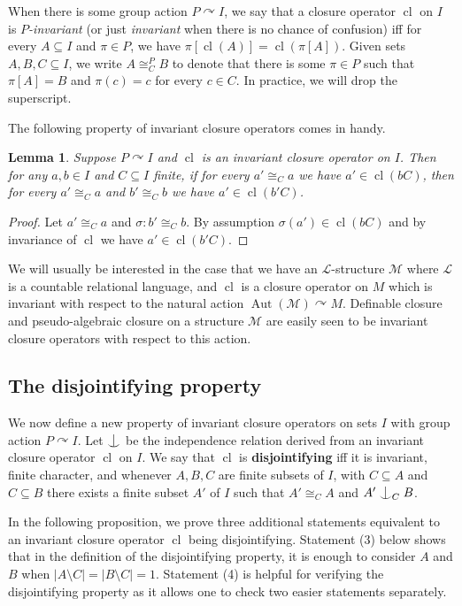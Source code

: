 \documentclass[12pt]{amsart}
\theoremstyle{plain}
\newtheorem{lemma}[theorem]{Lemma}
\theoremstyle{definition}
\newcommand{\isom}{\cong}
\newcommand{\mcL}{\mathcal{L}}
\newcommand{\mcM}{\mathcal{M}}
\DeclareMathOperator{\Aut}{Aut}
\DeclareMathOperator{\cl}{cl}
\newcommand{\forkindep}[1][]{%
  \mathrel{
    \mathop{
      \vcenter{
        \hbox{\oalign{\noalign{\kern-.3ex}\hfil$\vert$\hfil\cr
              \noalign{\kern-.7ex}
              $\smile$\cr\noalign{\kern-.3ex}}}
      }
    }\displaylimits_{#1}
  }
}
\begin{document}
When there is some group action $P \curvearrowright I$, we say that a closure operator $\cl$ on $I$ is 
\emph{$P$-invariant} (or just \emph{invariant} when there is no chance of confusion) iff for every $A \subseteq I$ and $\pi \in P$, we have $\pi[\cl(A)] = \cl(\pi[A])$. 
Given sets $A, B, C \subseteq I$, we write $A \isom^P_C B$ to denote that there is some $\pi \in P$ such that $\pi[A] = B$ and $\pi(c) = c$ for every $c \in C$.
In practice, we will drop the superscript.

The following property of invariant closure operators comes in handy.
\begin{lemma}\label{lem:one_side}
Suppose $P \curvearrowright I$ and $\cl$ is an invariant closure operator on $I$. Then for any $a, b \in I$ and $C \subseteq I$ finite, if for every $a' \isom_{C} a$ we have $a' \in \cl(bC)$, then for every $a' \isom_{C} a$ and $b' \isom_{C} b$ we have $a' \in \cl(b' C)$.
\end{lemma}

\begin{proof}
Let $a' \isom_C a$ and $\sigma : b' \isom_C b$. By assumption $\sigma(a') \in \cl(bC)$ and by invariance of $\cl$ we have $a' \in \cl(b'C)$.
\end{proof}

We will usually be interested in the case that we have an $\mcL$-structure $\mcM$ where $\mcL$ is a countable relational language, and $\cl$ is a closure operator on $M$ which is invariant with respect to the natural action $\Aut(\mcM) \curvearrowright M$.
Definable closure and pseudo-algebraic closure on a structure $\mcM$ are easily seen to be invariant closure operators with respect to this action.

\subsection{The disjointifying property}

We now define a new property of invariant closure operators on sets $I$ with group action $P \curvearrowright I$.
Let $\forkindep$ be the independence relation derived from an invariant closure operator $\cl$ on $I$.
We say that $\cl$ is \textbf{disjointifying} iff it is invariant, finite character, and whenever $A, B, C$ are finite subsets of $I$, with $C \subseteq A$ and $C \subseteq B$ there exists a finite subset $A'$ of $I$ such that $A' \isom_C A$ and $A' \forkindep[C] B$.

In the following proposition, we prove three additional statements equivalent to an invariant closure operator $\cl$ being disjointifying. 
Statement (3) below shows that in the definition of the disjointifying property, it is enough to consider $A$ and $B$ when $|A \setminus C| = |B \setminus C| = 1$. 
Statement (4) is helpful for verifying the disjointifying property as it allows one to check two easier statements separately.
\end{document}
